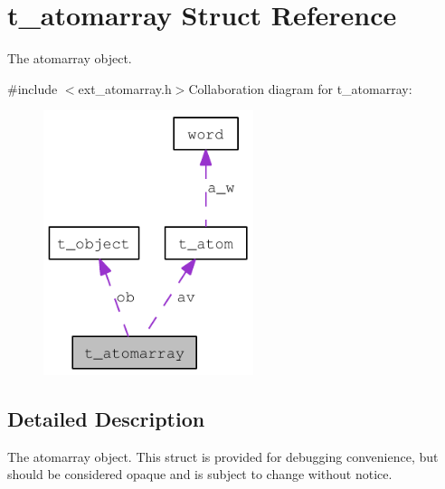 \hypertarget{structt__atomarray}{
\section{t\_\-atomarray Struct Reference}
\label{structt__atomarray}
}


The atomarray object.  


{\ttfamily \#include $<$ext\_\-atomarray.h$>$}Collaboration diagram for t\_\-atomarray:\nopagebreak
\begin{figure}[H]
\begin{center}
\leavevmode
\includegraphics[width=174pt]{structt__atomarray__coll__graph}
\end{center}
\end{figure}


\subsection{Detailed Description}
The atomarray object. This struct is provided for debugging convenience, but should be considered opaque and is subject to change without notice. 